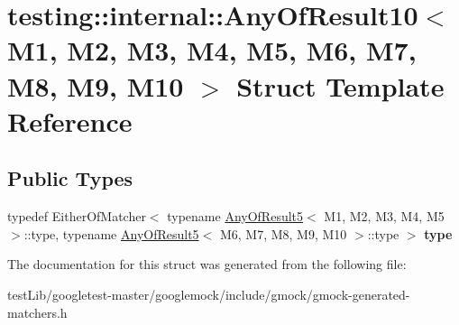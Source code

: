 \hypertarget{structtesting_1_1internal_1_1AnyOfResult10}{}\section{testing\+:\+:internal\+:\+:Any\+Of\+Result10$<$ M1, M2, M3, M4, M5, M6, M7, M8, M9, M10 $>$ Struct Template Reference}
\label{structtesting_1_1internal_1_1AnyOfResult10}
\subsection*{Public Types}
\begin{DoxyCompactItemize}
\item 
\mbox{\label{structtesting_1_1internal_1_1AnyOfResult10_aa1cb3d733f29716f2015db8a2b6c1c94}} 
typedef Either\+Of\+Matcher$<$ typename \hyperlink{structtesting_1_1internal_1_1AnyOfResult5}{Any\+Of\+Result5}$<$ M1, M2, M3, M4, M5 $>$\+::type, typename \hyperlink{structtesting_1_1internal_1_1AnyOfResult5}{Any\+Of\+Result5}$<$ M6, M7, M8, M9, M10 $>$\+::type $>$ {\bfseries type}
\end{DoxyCompactItemize}


The documentation for this struct was generated from the following file\+:\begin{DoxyCompactItemize}
\item 
test\+Lib/googletest-\/master/googlemock/include/gmock/gmock-\/generated-\/matchers.\+h\end{DoxyCompactItemize}
